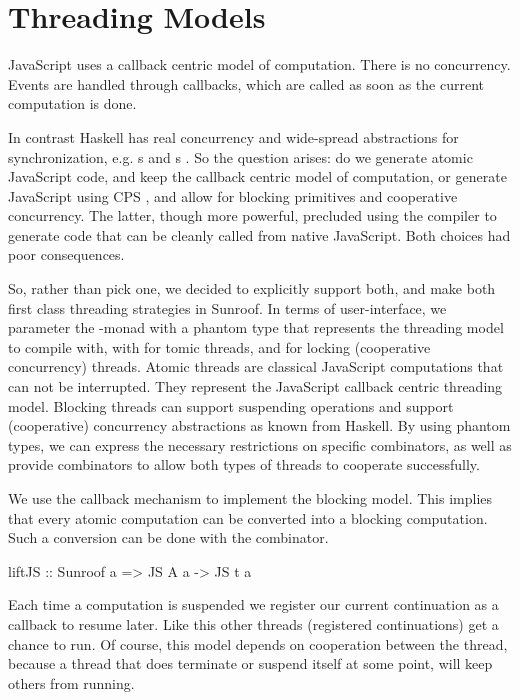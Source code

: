  
\section{Threading Models}
\label{sec:threading-models}

JavaScript uses a callback centric model of computation. There
is no concurrency. Events are handled through callbacks,
which are called as soon as the current computation is done.

In contrast Haskell has real concurrency and wide-spread 
abstractions for synchronization, e.g. s and s
.
So the question arises: do we generate atomic JavaScript code, 
and keep the callback centric model of computation, or generate JavaScript
using CPS \cite{Claessen:99:PoorMansConcurrencyMonad}, 
and allow for blocking primitives and
cooperative concurrency. The latter, though more powerful, 
precluded using the compiler to generate
code that can be cleanly called from native JavaScript.
Both choices had poor consequences.

So, rather than pick one, we decided to explicitly support both,
and make both first class threading strategies in Sunroof.
In terms of user-interface, we parameter the \JS-monad
with a phantom type that represents the threading model
to compile with, with  for tomic threads,
and  for locking (cooperative concurrency) threads. 
Atomic threads are classical JavaScript computations that
can not be interrupted. They represent the JavaScript callback
centric threading model. Blocking threads can
support suspending operations and support (cooperative) concurrency
abstractions as known from Haskell. By using phantom
types, we can express the necessary
restrictions on specific combinators, as well
as provide combinators to allow both types of
threads to cooperate successfully.

We use the callback mechanism to implement the blocking model.
This implies that every atomic computation can be converted into 
a blocking computation. Such a conversion can be done with the
 combinator.
\begin{Code}
liftJS :: Sunroof a => JS A a -> JS t a
\end{Code}
Each time a computation is suspended we register our current
continuation as a callback to resume later. Like this other 
threads (registered continuations) get a chance to run.
Of course, this model depends on cooperation between the thread,
because a thread that does terminate or suspend itself at some
point, will keep others from running.

